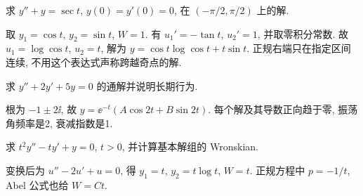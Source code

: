 \begin{example}求 $y''+y=\sec t$, $y(0)=y'(0)=0$, 在 $(-\pi/2,\pi/2)$ 上的解.\end{example}
\begin{solution}
取 $y_1=\cos t$, $y_2=\sin t$, $W=1$. 有 $u_1'=-\tan t$, $u_2'=1$, 并取零积分常数. 故 $u_1=\log\cos t$, $u_2=t$, 解为 $y=\cos t\log\cos t+t\sin t$. 正规右端只在指定区间连续, 不用这个表达式声称跨越奇点的解.
\end{solution}
\begin{exercise}求 $y''+2y'+5y=0$ 的通解并说明长期行为.\end{exercise}
\begin{solution}根为 $-1\pm2\ii$, 故 $y=\ee^{-t}(A\cos2t+B\sin2t)$. 每个解及其导数正向趋于零, 振荡角频率是2, 衰减指数是1.\end{solution}
\begin{exercise}求 $t^2y''-ty'+y=0$, $t>0$, 并计算基本解组的 Wronskian.\end{exercise}
\begin{solution}变换后为 $u''-2u'+u=0$, 得 $y_1=t$, $y_2=t\log t$, $W=t$. 正规方程中 $p=-1/t$, Abel 公式也给 $W=Ct$.\end{solution}
